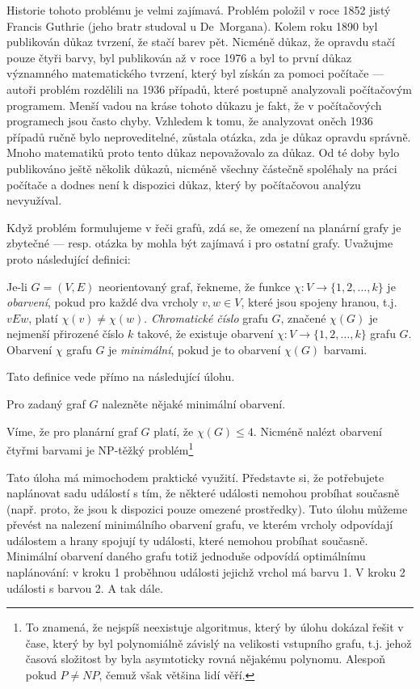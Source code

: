 Historie tohoto problému je velmi zajímavá. Problém položil v roce 1852 jistý Francis Guthrie (jeho bratr studoval u De~Morgana). Kolem roku 1890
byl publikován důkaz tvrzení, že stačí barev pět. Nicméně důkaz, že opravdu stačí pouze čtyři barvy, byl publikován až v roce 1976 a byl to první
důkaz významného matematického tvrzení, který byl získán za pomoci počítače --- autoři problém rozdělili na 1936 případů, které postupně analyzovali
počítačovým programem. Menší vadou na kráse tohoto důkazu je fakt, že v počítačových programech jsou často chyby. Vzhledem k tomu, že
analyzovat oněch 1936 případů ručně bylo neproveditelné, zůstala otázka, zda je důkaz opravdu správně. Mnoho matematiků proto tento důkaz nepovažovalo
za důkaz. Od té doby bylo publikováno ještě několik důkazů, nicméně všechny částečně spoléhaly na práci počítače a dodnes není k dispozici důkaz, který
by počítačovou analýzu nevyužíval.

Když problém formulujeme v řeči grafů, zdá se, že omezení na planární grafy je zbytečné --- resp. otázka by mohla být zajímavá i pro ostatní grafy. Uvažujme proto následující
definici:

\begin{definition} Je-li $G=(V,E)$ neorientovaný graf, řekneme, že funkce $\chi: V\to \{1,2,\ldots, k\}$ je \emph{obarvení}, pokud pro každé dva vrcholy $v,w\in V$,
které jsou spojeny hranou, t.j. $vEw$, platí $\chi(v)\neq \chi(w)$. \emph{Chromatické číslo} grafu $G$, značené $\chi(G)$ je nejmenší přirozené číslo $k$ takové,
že existuje obarvení $\chi:V\to\{1,2,\ldots,k\}$ grafu $G$. Obarvení $\chi$ grafu $G$ je \emph{minimální}, pokud je to obarvení $\chi(G)$ barvami.
\end{definition}

Tato definice vede přímo na následující úlohu.

\begin{question}\label{uloha:minimalcoloring} Pro zadaný graf $G$ nalezněte nějaké minimální obarvení.
\end{question}

Víme, že pro planární graf $G$ platí, že $\chi(G)\leq 4$. Nicméně nalézt obarvení čtyřmi barvami je NP-těžký problém\footnote{To znamená, že nejspíš neexistuje
algoritmus, který by úlohu dokázal řešit v čase, který by byl polynomiálně závislý na velikosti vstupního grafu, t.j. jehož časová složitost by byla asymtoticky rovná nějakému polynomu. Alespoň pokud $P\neq NP$, čemuž však většina lidí věří.}

Tato úloha má mimochodem praktické využití. Představte si, že potřebujete naplánovat sadu událostí s tím, že některé události nemohou probíhat současně (např. proto, že
jsou k dispozici pouze omezené prostředky). Tuto úlohu můžeme převést na nalezení minimálního obarvení grafu, ve kterém vrcholy odpovídají událostem a hrany spojují
ty události, které nemohou probíhat současně. Minimální obarvení daného grafu totiž jednoduše odpovídá optimálnímu naplánování: v kroku 1 proběhnou události
jejichž vrchol má barvu 1. V kroku 2 události s barvou 2. A tak dále.

